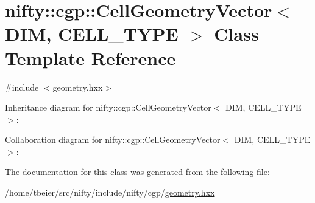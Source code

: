 \hypertarget{classnifty_1_1cgp_1_1CellGeometryVector}{}\section{nifty\+:\+:cgp\+:\+:Cell\+Geometry\+Vector$<$ D\+I\+M, C\+E\+L\+L\+\_\+\+T\+Y\+P\+E $>$ Class Template Reference}
\label{classnifty_1_1cgp_1_1CellGeometryVector}


{\ttfamily \#include $<$geometry.\+hxx$>$}



Inheritance diagram for nifty\+:\+:cgp\+:\+:Cell\+Geometry\+Vector$<$ D\+I\+M, C\+E\+L\+L\+\_\+\+T\+Y\+P\+E $>$\+:


Collaboration diagram for nifty\+:\+:cgp\+:\+:Cell\+Geometry\+Vector$<$ D\+I\+M, C\+E\+L\+L\+\_\+\+T\+Y\+P\+E $>$\+:


The documentation for this class was generated from the following file\+:\begin{DoxyCompactItemize}
\item 
/home/tbeier/src/nifty/include/nifty/cgp/\hyperlink{geometry_8hxx}{geometry.\+hxx}\end{DoxyCompactItemize}

